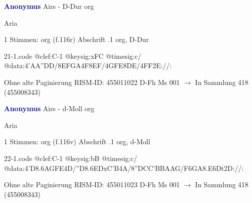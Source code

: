 \documentclass[twocolumn]{book}
\begin{document}
\newline \par \vspace{7pt} \textcolor{darkblue}{\textbf{Anonymus  }}
\newline Airs - D-Dur
\newline org
\newline \begin{itshape}[f.116r, heading:] Aria\end{itshape} 
\newline \textcolor{darkblue}{}  1 Stimmen: org  (f.116r)
\newline Abschrift
.1  org, D-Dur  
\begin{filecontents*}{21-1.code}
@clef:C-1
@keysig:xFC
@timesig:c/
@data:4'AA''DD/{8EFGA}4F{8EF}/4GFE{8DE}/4FF2E://:
\end{filecontents*}
\newline
%
\newline Ohne alte Paginierung
\newline RISM-ID: 455011022
\newline D-Fh  Ms 001
\newline $\rightarrow$ In Sammlung 418 (455008343)
      
\newline \par \vspace{7pt} \textcolor{darkblue}{\textbf{Anonymus  }}
\newline Airs - d-Moll
\newline org
\newline \begin{itshape}[f.116v, heading:] Aria\end{itshape} 
\newline \textcolor{darkblue}{}  1 Stimmen: org  (f.116v)
\newline Abschrift
.1  org, d-Moll  
\begin{filecontents*}{22-1.code}
@clef:C-1
@keysig:bB
@timesig:c/
@data:4'D{8.6AG}{FE}4D/''D{8.6ED}{xC'B}4A/{8''DC}{C'B}{BA}{AG}/{F6GA}{8.E6Dt}2D://:
\end{filecontents*}
\newline
%
\newline Ohne alte Paginierung
\newline RISM-ID: 455011023
\newline D-Fh  Ms 001
\newline $\rightarrow$ In Sammlung 418 (455008343)
      
\end{document}
